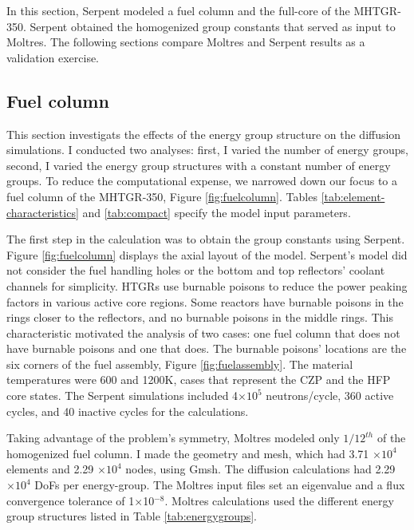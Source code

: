 In this section, Serpent modeled a fuel column and the full-core of the MHTGR-350.
Serpent obtained the homogenized group constants that served as input to Moltres.
The following sections compare Moltres and Serpent results as a validation exercise.

\subsection{Fuel column}

This section investigats the effects of the energy group structure on the diffusion simulations.
I conducted two analyses: first, I varied the number of energy groups, second, I varied the energy group structures with a constant number of energy groups.
To reduce the computational expense, we narrowed down our focus to a fuel column of the MHTGR-350, Figure \ref{fig:fuelcolumn}.
Tables \ref{tab:element-characteristics} and \ref{tab:compact} specify the model input parameters.

The first step in the calculation was to obtain the group constants using Serpent.
Figure \ref{fig:fuelcolumn} displays the axial layout of the model.
Serpent's model did not consider the fuel handling holes or the bottom and top reflectors' coolant channels for simplicity.
\glspl{HTGR} use burnable poisons to reduce the power peaking factors in various active core regions.
Some reactors have burnable poisons in the rings closer to the reflectors, and no burnable poisons in the middle rings.
This characteristic motivated the analysis of two cases: one fuel column that does not have burnable poisons and one that does.
The burnable poisons' locations are the six corners of the fuel assembly, Figure \ref{fig:fuelassembly}.
The material temperatures were 600 and 1200K, cases that represent the \gls{CZP} and the \gls{HFP} core states.
The Serpent simulations included 4$\times 10^5$ neutrons/cycle, 360 active cycles, and 40 inactive cycles for the calculations.

Taking advantage of the problem's symmetry, Moltres modeled only $1/12^{th}$ of the homogenized fuel column.
I made the geometry and mesh, which had 3.71 $\times 10^4$ elements and 2.29 $\times 10^4$ nodes, using Gmsh.
The diffusion calculations had 2.29 $\times 10^4$ \glspl{DoF} per energy-group.
The Moltres input files set an eigenvalue and a flux convergence tolerance of 1$\times$10$^{-8}$.
Moltres calculations used the different energy group structures listed in Table \ref{tab:energygroups}.

